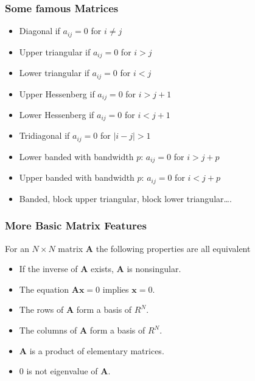 \documentclass[letterpaper,10pt,english]{sphinxmanual}
\begin{document}
\subsubsection{Some famous Matrices}
\label{\detokenize{chapter3:some-famous-matrices}}\begin{itemize}
\item {} 
Diagonal if \(a_{ij}=0\) for \(i\ne j\)

\item {} 
Upper triangular if \(a_{ij}=0\) for \(i > j\)

\item {} 
Lower triangular if \(a_{ij}=0\) for \(i < j\)

\item {} 
Upper Hessenberg if \(a_{ij}=0\) for \(i > j+1\)

\item {} 
Lower Hessenberg if \(a_{ij}=0\) for \(i < j+1\)

\item {} 
Tridiagonal if \(a_{ij}=0\) for \(|i -j| > 1\)

\item {} 
Lower banded with bandwidth \(p\): \(a_{ij}=0\) for \(i > j+p\)

\item {} 
Upper banded with bandwidth \(p\): \(a_{ij}=0\) for \(i < j+p\)

\item {} 
Banded, block upper triangular, block lower triangular….

\end{itemize}


\subsubsection{More Basic Matrix Features}
\label{\detokenize{chapter3:more-basic-matrix-features}}

For an \(N\times N\) matrix  \(\mathbf{A}\) the following properties are all equivalent
\begin{itemize}
\item {} 
If the inverse of \(\mathbf{A}\) exists, \(\mathbf{A}\) is nonsingular.

\item {} 
The equation \(\mathbf{Ax}=0\) implies \(\mathbf{x}=0\).

\item {} 
The rows of \(\mathbf{A}\) form a basis of \(R^N\).

\item {} 
The columns of \(\mathbf{A}\) form a basis of \(R^N\).

\item {} 
\(\mathbf{A}\) is a product of elementary matrices.

\item {} 
\(0\) is not eigenvalue of \(\mathbf{A}\).

\end{itemize}
\end{document}
